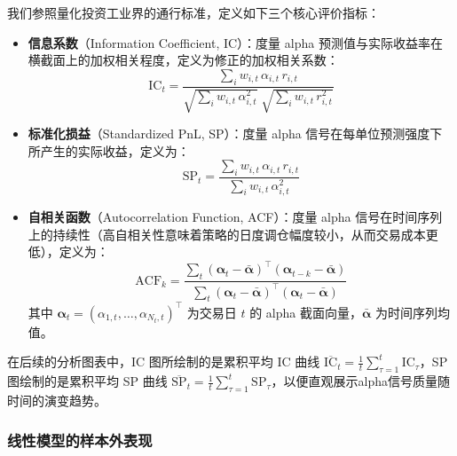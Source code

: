 \documentclass{article}
\begin{document}
我们参照量化投资工业界的通行标准，定义如下三个核心评价指标：

\begin{itemize}
    \item \textbf{信息系数}（Information Coefficient, IC）：度量 alpha 预测值与实际收益率在横截面上的加权相关程度，定义为修正的加权相关系数：
    \begin{equation}
        \text{IC}_t = \frac{\sum_{i} w_{i,t}\, \alpha_{i,t}\, r_{i,t}}{\sqrt{\sum_{i} w_{i,t}\, \alpha_{i,t}^2}\;\sqrt{\sum_{i} w_{i,t}\, r_{i,t}^2}}
        \label{eq:ic}
    \end{equation}

    \item \textbf{标准化损益}（Standardized PnL, SP）：度量 alpha 信号在每单位预测强度下所产生的实际收益，定义为：
    \begin{equation}
        \text{SP}_t = \frac{\sum_{i} w_{i,t}\, \alpha_{i,t}\, r_{i,t}}{\sum_{i} w_{i,t}\, \alpha_{i,t}^2}
        \label{eq:sp}
    \end{equation}

    \item \textbf{自相关函数}（Autocorrelation Function, ACF）：度量 alpha 信号在时间序列上的持续性（高自相关性意味着策略的日度调仓幅度较小，从而交易成本更低），定义为：
    \begin{equation}
        \text{ACF}_k = \frac{\sum_{t}\left(\boldsymbol{\alpha}_t - \bar{\boldsymbol{\alpha}}\right)^{\top}\!\left(\boldsymbol{\alpha}_{t-k} - \bar{\boldsymbol{\alpha}}\right)}{\sum_{t}\left(\boldsymbol{\alpha}_t - \bar{\boldsymbol{\alpha}}\right)^{\top}\!\left(\boldsymbol{\alpha}_t - \bar{\boldsymbol{\alpha}}\right)}
        \label{eq:acf}
    \end{equation}
    其中 $\boldsymbol{\alpha}_t = (\alpha_{1,t}, \ldots, \alpha_{N_t,t})^{\top}$ 为交易日 $t$ 的 alpha 截面向量，$\bar{\boldsymbol{\alpha}}$ 为时间序列均值。
\end{itemize}

在后续的分析图表中，IC 图所绘制的是累积平均 IC 曲线 $\overline{\text{IC}}_t = \frac{1}{t}\sum_{\tau=1}^{t}\text{IC}_{\tau}$，SP 图绘制的是累积平均 SP 曲线 $\overline{\text{SP}}_t = \frac{1}{t}\sum_{\tau=1}^{t}\text{SP}_{\tau}$，以便直观展示alpha信号质量随时间的演变趋势。

\subsubsection{线性模型的样本外表现}
\label{sec:linear_results}
\end{document}
